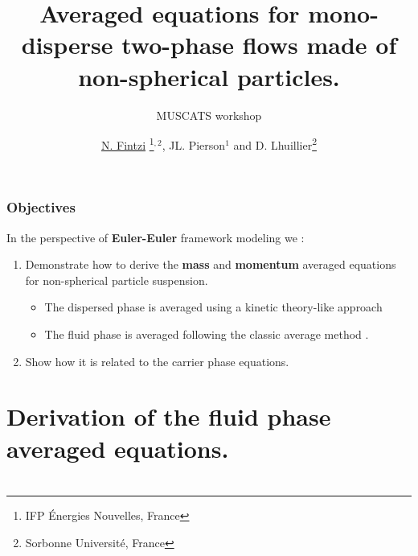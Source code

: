 \documentclass{sintefbeamer}
\title{Averaged equations for mono-disperse two-phase flows made of non-spherical particles. }
\subtitle{MUSCATS workshop}
\author{\underline{N. Fintzi} \footnote{IFP \'Energies Nouvelles, France}$^{,2}$, JL. Pierson$^1$ and D. Lhuillier\footnote{Sorbonne Universit\'e, France}}
\begin{document}
\maketitle
\section*{}

\begin{frame}
  \frametitle{Objectives}

In the perspective of \textbf{Euler-Euler} framework modeling we : 
\begin{enumerate}
  \item Demonstrate how to derive the \textbf{mass} and \textbf{momentum} averaged equations for non-spherical particle suspension. 
  \begin{itemize}
    \item The dispersed phase is averaged using a kinetic theory-like approach \citep{jackson1997locally,zhang1994averaged}
    \item The fluid phase is averaged following the classic average method \citep{drew1983mathematical}. 
  \end{itemize}
  \item Show how it is related to the carrier phase equations.  
\end{enumerate}
\end{frame}

\section{Derivation of the fluid phase averaged equations.}
\section*{}
\end{document}
